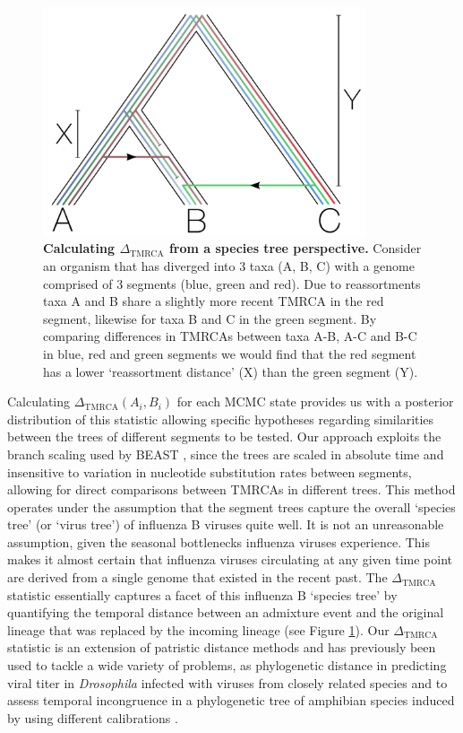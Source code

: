 \documentclass[11pt,oneside,letterpaper]{article}
\newcommand{\dtmrca}{\Delta_\mathrm{TMRCA}}
\begin{document}
\begin{figure}[h]
	\centering	
	\includegraphics[width=0.85\textwidth]{supp_figures/InfB_methodSpeciesTree.pdf}
	\caption{\textbf{Calculating $\dtmrca$ from a species tree perspective.}
Consider an organism that has diverged into 3 taxa (A, B, C) with a genome comprised of 3 segments (blue, green and red).
Due to reassortments taxa A and B share a slightly more recent TMRCA in the red segment, likewise for taxa B and C in the green segment.
By comparing differences in TMRCAs between taxa A-B, A-C and B-C in blue, red and green segments we would find that the red segment has a lower `reassortment distance' (X) than the green segment (Y).
}
	\label{speciesTree}
\end{figure}

Calculating $\dtmrca(A_i, B_i)$ for each MCMC state provides us with a posterior distribution of this statistic allowing  specific hypotheses regarding similarities between the trees of different segments to be tested.
Our approach exploits the branch scaling used by BEAST \citep{drummond2012}, since the trees are scaled in absolute time and insensitive to variation in nucleotide substitution rates between segments, allowing for direct comparisons between TMRCAs in different trees.
This method operates under the assumption that the segment trees capture the overall `species tree' (or `virus tree') of influenza B viruses quite well.
It is not an unreasonable assumption, given the seasonal bottlenecks influenza viruses experience.
This makes it almost certain that influenza viruses circulating at any given time point are derived from a single genome that existed in the recent past.
The $\dtmrca$ statistic essentially captures a facet of this influenza B `species tree' by quantifying the temporal distance between an admixture event and the original lineage that was replaced by the incoming lineage (see Figure \ref{speciesTree}).
Our $\dtmrca$ statistic is an extension of patristic distance methods and has previously been used to tackle a wide variety of problems, as phylogenetic distance in predicting viral titer in \textit{Drosophila} infected with viruses from closely related species \citep{longdon2011} and to assess temporal incongruence in a phylogenetic tree of amphibian species induced by using different calibrations \citep{ruane2011}.
\end{document}

